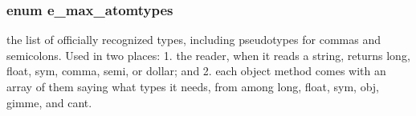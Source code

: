\hypertarget{group__atom_ga8aa6700e9f00b132eb376db6e39ade47}{
\subsubsection[{e\_\-max\_\-atomtypes}]{\setlength{\rightskip}{0pt plus 5cm}enum {\bf e\_\-max\_\-atomtypes}}}
\label{group__atom_ga8aa6700e9f00b132eb376db6e39ade47}


the list of officially recognized types, including pseudotypes for commas and semicolons. Used in two places: 1. the reader, when it reads a string, returns long, float, sym, comma, semi, or dollar; and 2. each object method comes with an array of them saying what types it needs, from among long, float, sym, obj, gimme, and cant.

